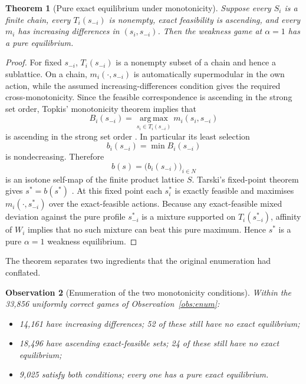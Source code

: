 \documentclass[11pt]{article}
\newtheorem{theorem}{Theorem}
\newtheorem{observation}[theorem]{Observation}
\theoremstyle{definition}
\newcommand{\argmax}{\operatorname*{arg\,max}}
\begin{document}
\begin{theorem}[Pure exact equilibrium under monotonicity]\label{thm:monotone}
Suppose every $S_i$ is a finite chain, every $T_i(s_{-i})$ is nonempty, exact feasibility is ascending, and every $m_i$ has increasing differences in $(s_i,s_{-i})$. Then the weakness game at $\alpha=1$ has a pure equilibrium.
\end{theorem}

\begin{proof}
For fixed $s_{-i}$, $T_i(s_{-i})$ is a nonempty subset of a chain and hence a sublattice. On a chain, $m_i(\cdot,s_{-i})$ is automatically supermodular in the own action, while the assumed increasing-differences condition gives the required cross-monotonicity. Since the feasible correspondence is ascending in the strong set order, Topkis' monotonicity theorem implies that
\[
B_i(s_{-i})=\argmax_{s_i\in T_i(s_{-i})}m_i(s_i,s_{-i})
\]
is ascending in the strong set order \cite{topkis,milgromroberts}. In particular its least selection
\[
b_i(s_{-i})=\min B_i(s_{-i})
\]
is nondecreasing. Therefore
\[
b(s)=\bigl(b_i(s_{-i})\bigr)_{i\in N}
\]
is an isotone self-map of the finite product lattice $S$. Tarski's fixed-point theorem gives $s^*=b(s^*)$ \cite{tarski}. At this fixed point each $s_i^*$ is exactly feasible and maximises $m_i(\cdot,s_{-i}^*)$ over the exact-feasible actions. Because any exact-feasible mixed deviation against the pure profile $s_{-i}^*$ is a mixture supported on $T_i(s_{-i}^*)$, affinity of $W_i$ implies that no such mixture can beat this pure maximum. Hence $s^*$ is a pure $\alpha=1$ weakness equilibrium.
\end{proof}

The theorem separates two ingredients that the original enumeration had conflated.

\begin{observation}[Enumeration of the two monotonicity conditions]\label{obs:monotonecounts}
Within the 33,856 uniformly correct games of Observation~\ref{obs:enum}:
\begin{itemize}
\item 14,161 have increasing differences; 52 of these still have no exact equilibrium;
\item 18,496 have ascending exact-feasible sets; 24 of these still have no exact equilibrium;
\item 9,025 satisfy both conditions; every one has a pure exact equilibrium.
\end{itemize}
\end{observation}
\end{document}
